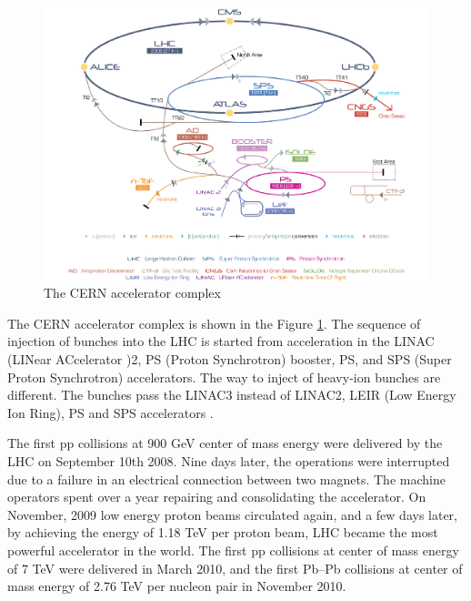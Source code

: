 \begin{figure}[htbp]
\begin{center}
\includegraphics[width=12.cm]{./Version1/FigChapter4/FigureLHC}
\caption{ The CERN accelerator complex \cite{cite:LHCfig}}
\label{fig:lhc}
\end{center}
\end{figure}

The CERN accelerator complex is shown in the Figure \ref{fig:lhc}. The sequence of injection of bunches into the LHC is started from acceleration in the LINAC (LINear ACcelerator )2, PS (Proton Synchrotron) booster, PS, and SPS (Super Proton Synchrotron) accelerators. The way to inject of heavy-ion bunches are different. The bunches pass the LINAC3 instead of LINAC2, LEIR (Low Energy Ion Ring), PS and SPS accelerators \cite{cite:LHCinfo}. 


The first pp collisions at 900 GeV center of mass energy were delivered by the LHC on September 10th 2008. Nine days later, the operations were interrupted due to a failure in an electrical connection between two magnets. The machine operators spent over a year repairing and consolidating the accelerator. On November, 2009 low energy proton beams circulated again, and a few days later, by achieving the energy of 1.18 TeV per proton beam, LHC became the most powerful accelerator in the world. The first pp collisions at center of mass energy of 7 TeV were delivered in March 2010, and the first Pb--Pb collisions at center of mass energy of 2.76 TeV per nucleon pair in November 2010. 

